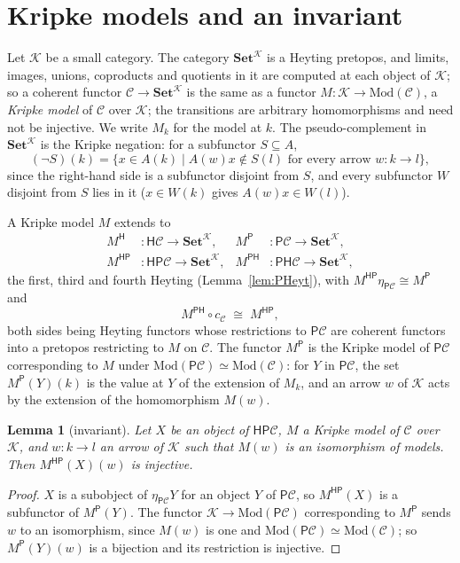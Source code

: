 \documentclass[11pt]{amsart}
\newtheorem{lem}[thm]{Lemma}
\theoremstyle{definition}
\newcommand{\Mod}{\mathrm{Mod}}
\newcommand{\Set}{\mathbf{Set}}
\newcommand{\PP}{\mathsf P}
\newcommand{\HH}{\mathsf H}
\newcommand{\cC}{\mathcal C}
\newcommand{\cK}{\mathcal K}
\begin{document}
\section{Kripke models and an invariant}

Let $\cK$ be a small category. The category $\Set^{\cK}$ is a Heyting
pretopos, and limits, images, unions, coproducts and quotients in it
are computed at each object of $\cK$; so a coherent functor $\cC\to
\Set^{\cK}$ is the same as a functor $M\colon\cK\to\Mod(\cC)$, a
\emph{Kripke model} of $\cC$ over $\cK$; the transitions are arbitrary
homomorphisms and need not be injective. We write $M_k$ for the model
at $k$. The pseudo-complement in $\Set^{\cK}$ is the Kripke negation:
for a subfunctor $S\subseteq A$,
\begin{equation}\label{eq:neg}
(\neg S)(k)=\{x\in A(k)\mid A(w)x\notin S(l)\text{ for every arrow }
w\colon k\to l\},
\end{equation}
since the right-hand side is a subfunctor disjoint from $S$, and every
subfunctor $W$ disjoint from $S$ lies in it ($x\in W(k)$ gives
$A(w)x\in W(l)$).

A Kripke model $M$ extends to
\begin{align*}
M^{\HH}&\colon\HH\cC\to\Set^{\cK},& M^{\PP}&\colon\PP\cC\to\Set^{\cK},\\
M^{\HH\PP}&\colon\HH\PP\cC\to\Set^{\cK},&
M^{\PP\HH}&\colon\PP\HH\cC\to\Set^{\cK},
\end{align*}
the first, third and fourth Heyting (Lemma~\ref{lem:PHeyt}), with
$M^{\HH\PP}\eta_{\PP\cC}\cong M^{\PP}$ and
\begin{equation}\label{eq:compat}
M^{\PP\HH}\circ c_\cC\;\cong\;M^{\HH\PP},
\end{equation}
both sides being Heyting functors whose restrictions to $\PP\cC$ are
coherent functors into a pretopos restricting to $M$ on $\cC$. The
functor $M^{\PP}$ is the Kripke model of $\PP\cC$ corresponding to $M$
under $\Mod(\PP\cC)\simeq\Mod(\cC)$: for $Y$ in $\PP\cC$, the set
$M^{\PP}(Y)(k)$ is the value at $Y$ of the extension of $M_k$, and an
arrow $w$ of $\cK$ acts by the extension of the homomorphism $M(w)$.

\begin{lem}[invariant]\label{lem:rigid}
Let $X$ be an object of $\HH\PP\cC$, $M$ a Kripke model of $\cC$ over
$\cK$, and $w\colon k\to l$ an arrow of $\cK$ such that $M(w)$ is an
isomorphism of models. Then $M^{\HH\PP}(X)(w)$ is injective.
\end{lem}
\begin{proof}
$X$ is a subobject of $\eta_{\PP\cC}Y$ for an object $Y$ of $\PP\cC$,
so $M^{\HH\PP}(X)$ is a subfunctor of $M^{\PP}(Y)$. The functor
$\cK\to\Mod(\PP\cC)$ corresponding to $M^{\PP}$ sends $w$ to an
isomorphism, since $M(w)$ is one and $\Mod(\PP\cC)\simeq\Mod(\cC)$; so
$M^{\PP}(Y)(w)$ is a bijection and its restriction is injective.
\end{proof}
\end{document}
